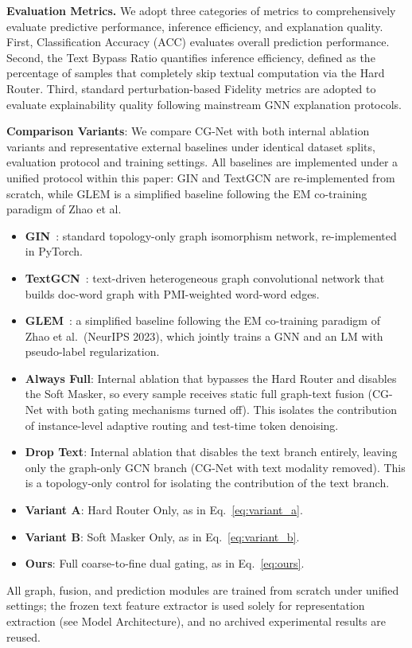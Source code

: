 \documentclass[preprint,12pt,authoryear]{elsarticle}
\begin{document}
\noindent\textbf{Evaluation Metrics.}
We adopt three categories of metrics to comprehensively evaluate predictive performance, inference efficiency, and explanation quality.
First, Classification Accuracy (ACC) evaluates overall prediction performance.
Second, the Text Bypass Ratio quantifies inference efficiency, defined as the percentage of samples that completely skip textual computation via the Hard Router.
Third, standard perturbation-based Fidelity metrics are adopted to evaluate explainability quality following mainstream GNN explanation protocols.

\noindent\textbf{Comparison Variants}: We compare CG-Net with both internal ablation variants and representative external baselines under identical dataset splits, evaluation protocol and training settings. All baselines are implemented under a unified protocol within this paper: GIN and TextGCN are re-implemented from scratch, while GLEM is a simplified baseline following the EM co-training paradigm of Zhao et al.
\begin{itemize}
    \item \textbf{GIN}~\citep{xu2019gin}: standard topology-only graph isomorphism network, re-implemented in PyTorch.
    \item \textbf{TextGCN}~\citep{yao2019textgcn}: text-driven heterogeneous graph convolutional network that builds doc-word graph with PMI-weighted word-word edges.
    \item \textbf{GLEM}~\citep{zhao2023glem}: a simplified baseline following the EM co-training paradigm of Zhao et al.\ (NeurIPS 2023), which jointly trains a GNN and an LM with pseudo-label regularization.
    \item \textbf{Always Full}: Internal ablation that bypasses the Hard Router and disables the Soft Masker, so every sample receives static full graph-text fusion (CG-Net with both gating mechanisms turned off). This isolates the contribution of instance-level adaptive routing and test-time token denoising.
    \item \textbf{Drop Text}: Internal ablation that disables the text branch entirely, leaving only the graph-only GCN branch (CG-Net with text modality removed). This is a topology-only control for isolating the contribution of the text branch.
    \item \textbf{Variant A}: Hard Router Only, as in Eq.~\eqref{eq:variant_a}.
    \item \textbf{Variant B}: Soft Masker Only, as in Eq.~\eqref{eq:variant_b}.
    \item \textbf{Ours}: Full coarse-to-fine dual gating, as in Eq.~\eqref{eq:ours}.
\end{itemize}
All graph, fusion, and prediction modules are trained from scratch under unified settings; the frozen text feature extractor is used solely for representation extraction (see Model Architecture), and no archived experimental results are reused.
\end{document}
